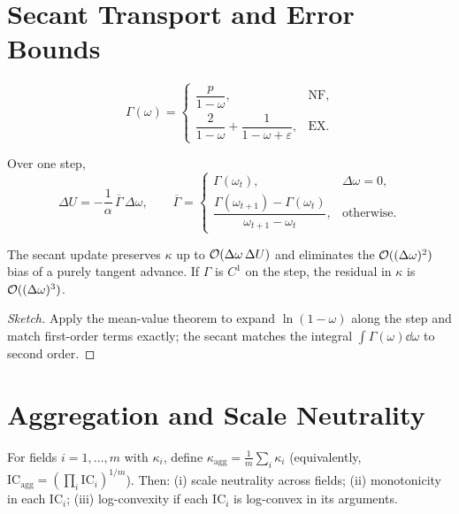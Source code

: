 \documentclass[onecolumn,amsmath,amssymb,aps]{revtex4-2}
\newcommand{\eps}{\varepsilon}
\newcommand{\kappaL}{\kappa}
\newcommand{\IC}{\mathrm{IC}}
\newcommand{\om}{\omega}
\newcommand{\Uvar}{U}
\newcommand{\alp}{\alpha}
\newcommand{\D}{\Delta}
\begin{document}
\section{Secant Transport and Error Bounds}\label{sec:secant}
\begin{definition}
\begin{equation}
\Gamma(\om)=
\begin{cases}
\dfrac{p}{1-\om}, & \text{NF},\\[2mm]
\dfrac{2}{1-\om}+\dfrac{1}{1-\om+\eps}, & \text{EX}.
\end{cases}
\end{equation}
\end{definition}
\begin{definition}
Over one step,
\begin{equation}
\D \Uvar = -\frac{1}{\alp}\,\overline{\Gamma}\,\D \om,\qquad
\overline{\Gamma}=
\begin{cases}
\Gamma(\om_t), & \D\om=0,\\[1mm]
\dfrac{\Gamma(\om_{t+1})-\Gamma(\om_t)}{\om_{t+1}-\om_t}, & \text{otherwise.}
\end{cases}
\end{equation}
\end{definition}
\begin{theorem}\label{thm:secant}
The secant update preserves $\kappaL$ up to ${\cal O}(\D\om\,\D \Uvar)$ and eliminates the ${\cal O}((\D\om)^2)$ bias of a purely tangent advance. If $\Gamma$ is $C^1$ on the step, the residual in $\kappaL$ is ${\cal O}((\D\om)^3)$.
\end{theorem}
\begin{proof}[Sketch]
Apply the mean-value theorem to expand $\ln(1-\om)$ along the step and match first-order terms exactly; the secant matches the integral $\int \Gamma(\om)\dd\om$ to second order.
\end{proof}

\section{Aggregation and Scale Neutrality}\label{sec:agg}
\begin{proposition}
For fields $i=1,\dots,m$ with $\kappaL_i$, define $\kappaL_\mathrm{agg}=\frac1m\sum_i \kappaL_i$ (equivalently, $\IC_\mathrm{agg}=(\prod_i \IC_i)^{1/m}$). Then: (i) scale neutrality across fields; (ii) monotonicity in each $\IC_i$; (iii) log-convexity if each $\IC_i$ is log-convex in its arguments.
\end{proposition}
\end{document}
